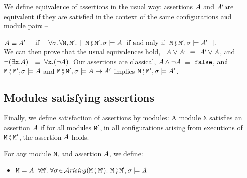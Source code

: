  
\label{sect:classical} 
We define equivalence of   assertions in the usual way: assertions $\A$ and $\A'$are equivalent if they are satisfied  in
the context of the same configurations and module pairs -- \ie\\
 \strut \hspace{1.1cm} $\A \equiv \A'\  \IFF\    \forall \sigma.\, \forall \M, \M'. \ [\ \ \M\mkpair \M', \sigma \models \A\ \mbox{ if and only if }\ \M\mkpair \M', \sigma \models \A'\ \ ].$\\
We can then prove that the usual equivalences hold, \eg\  $ \A \vee \A' \ \equiv \  \A' \vee \A$, and\   $\neg (\exists \prg{x}.\A )  \  \ \equiv \  \forall \prg{x}.(\neg  \A)$.
%
Our assertions are classical, \eg  $ \A \wedge\neg \A \ \equiv \  \prg{false}$, and $\M\mkpair \M', \sigma  \models \A$ and  $\M\mkpair \M', \sigma  \models \A \rightarrow \A'$  implies
$\M\mkpair \M', \sigma  \models \A '$. 

\subsection{Modules satisfying assertions}

Finally, we define satisfaction of assertions by modules: A module $\M$ satisfies an assertion $\A$ if for all modules $\M'$, in all configurations arising from executions of $\M\mkpair\M'$, the assertion $\A$ holds.

\begin{definition}
\label{def:module_satisfies}
For any module $\M$, and  assertion $\A$, we define:
\begin{itemize}
\item
$\M \models \A$ \IFF  $\forall \M'.\, \forall \sigma\!\in\!\Arising{\M\mkpair\M'}.\   \M\mkpair\M', \sigma \models \A$
\end{itemize}
\end{definition}

 




